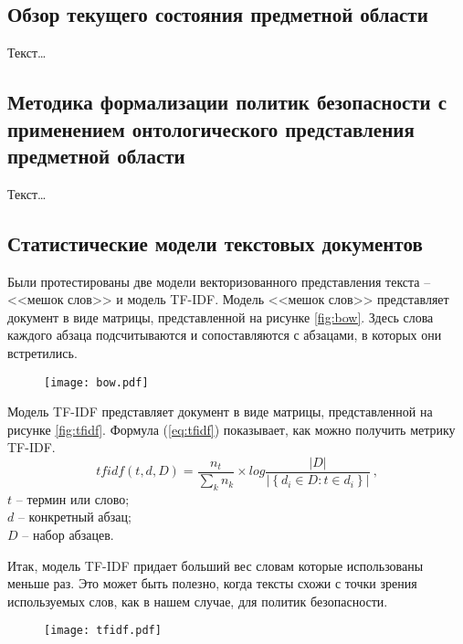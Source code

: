 \documentclass[../main]{subfiles}
\begin{document}
\subsection{Обзор текущего состояния предметной области}
Текст\dots

\subsection{Методика формализации политик безопасности с применением онтологического представления предметной области}
Текст\dots

\subsection{Статистические модели текстовых документов}

Были протестированы две модели векторизованного представления текста -- <<мешок слов>> и модель TF-IDF. Модель <<мешок слов>> представляет документ в виде матрицы, представленной на рисунке \ref{fig:bow}. Здесь слова каждого абзаца подсчитываются и сопоставляются с абзацами, в которых они встретились.

\begin{figure}[H]
    \centering
    {\texttt{[image: bow.pdf]}}
    \vspace{-\baselineskip}
\end{figure}


Модель TF-IDF представляет документ в виде матрицы, представленной на рисунке \ref{fig:tfidf}. Формула (\ref{eq:tfidf}) показывает, как можно получить метрику TF-IDF.
\begin{equation}
    \label{eq:tfidf}
    tfidf(t, d, D) = \frac{n_t}{\displaystyle\sum_k n_k} \times 
    log \frac{ \big|{D}\big| }
    { \big|\left\{ d_i \in D : t \in d_i \right\}\big| }\ ,
\end{equation}
$t$ -- термин или слово;\\
\makebox[12.5mm]{}$d$ -- конкретный абзац;\\
\makebox[12.5mm]{}$D$ -- набор абзацев. 

Итак, модель TF-IDF придает больший вес словам которые использованы меньше раз. Это может быть полезно, когда тексты схожи с точки зрения используемых слов, как в нашем случае, для политик безопасности.

\begin{figure}[H]
    \centering
    {\texttt{[image: tfidf.pdf]}}
    \vspace{-\baselineskip}
\end{figure}
\end{document}
